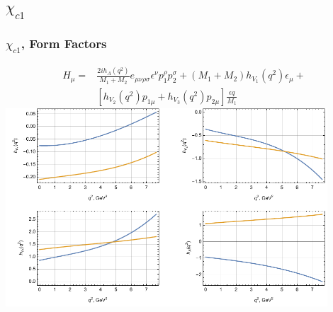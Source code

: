 \documentclass{beamer}
\begin{document}
\begin{frame}[t]
\begin{columns}
\begin{column}{0.5\textwidth}
    \end{column}
  \end{columns}
\end{frame}

\subsection{$\chi_{c1}$}
\begin{frame}
  \frametitle{$\chi_{c1}$, Form Factors}
  \begin{align*}
    \label{eq:1}
    H_\mu =& \frac{2i h_A(q^2)}{M_1+M_2}e_{\mu\nu\rho\sigma}\epsilon^\nu p_1^\rho p_2^\sigma
             + (M_1+M_2) h_{V_1}(q^2)\epsilon_\mu + \\
     & [h_{V_2}(q^2)p_{1\mu} + h_{V_3}(q^2)p_{2\mu}]\frac{\epsilon q}{M_1}
  \end{align*}
  \includegraphics[width=0.9\textwidth]{figs/ff_chi_c1}
\end{frame}
\end{document}
